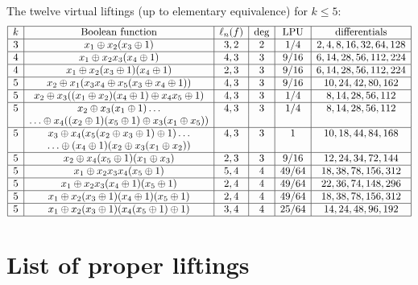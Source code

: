 \documentclass[11pt,english,a4paper]{amsart}
\theoremstyle{plain}
\theoremstyle{definition}
\theoremstyle{remark}
\begin{document}
	The twelve virtual liftings (up to elementary equivalence) for $k \leq 5$:
	\[
	\begin{array}{|c|c|c|c|c|c|} \hline
		k & \text{Boolean function} & \ell_n(f) & \deg & \operatorname{LPU} & \text{differentials} \\ \hline
		3 & x_1 \oplus x_2(x_3\oplus 1) & 3, 2 & 2 & 1/4 & 2, 4, 8, 16, 32, 64, 128 \\
		\hline
		4 & x_1 \oplus x_2 x_3 (x_4\oplus1) & 4, 3 & 3 & 9/16 & 6, 14, 28, 56, 112, 224 \\
		\hline
		4 & x_1 \oplus x_2 (x_3\oplus1) (x_4\oplus1) & 2, 3 & 3 & 9/16 & 6, 14, 28, 56, 112, 224 \\
		\hline
		5 & x_2 \oplus x_1 (x_3 x_4 \oplus x_5 (x_3 \oplus x_4 \oplus 1)) & 4, 3 & 3 & 9/16 & 10, 24, 42, 80, 162 \\
		\hline
		5 & x_2 \oplus x_3 ((x_1 \oplus x_2) (x_4 \oplus 1) \oplus x_4 x_5 \oplus 1) & 4, 3 & 3 & 1/4 & 8, 14, 28, 56, 112 \\
		\hline
		5 & x_2 \oplus x_3 (x_1 \oplus 1) \dotsc& 4, 3 & 3 & 1/4 & 8, 14, 28, 56, 112 \\
		& \dotsc \oplus x_4 ((x_2 \oplus 1) (x_5 \oplus 1) \oplus x_3 (x_1 \oplus x_5)) & & & & \\
		\hline
		5 & x_3 \oplus x_4 (x_5 (x_2 \oplus x_3 \oplus 1) \oplus 1) \dotsc & 4, 3 & 3 & 1 & 10, 18, 44, 84, 168 \\
		& \dotsc \oplus (x_4 \oplus 1) (x_2 \oplus x_3 (x_1 \oplus x_2)) & & & & \\
		\hline
		5 & x_2 \oplus x_4 (x_5 \oplus 1) (x_1 \oplus x_3) & 2, 3 & 3 & 9/16 & 12, 24, 34, 72, 144 \\
		\hline
		5 & x_1 \oplus x_2 x_3 x_4 (x_5 \oplus 1) & 5, 4 & 4 & 49/64 & 18, 38, 78, 156, 312 \\
		\hline
		5 & x_1 \oplus x_2 x_3 (x_4 \oplus 1) (x_5 \oplus 1) & 2, 4 & 4 & 49/64 & 22, 36, 74, 148, 296 \\
		\hline
		5 & x_1 \oplus x_2 (x_3 \oplus 1) (x_4 \oplus 1) (x_5 \oplus 1) & 2, 4 & 4 & 49/64 & 18, 38, 78, 156, 312 \\
		\hline
		5 & x_1 \oplus x_2 (x_3 \oplus 1) (x_4 (x_5 \oplus 1) \oplus 1) & 3, 4 & 4 & 25/64 & 14, 24, 48, 96, 192 \\
		\hline
	\end{array}
	\]


	\section{List of proper liftings}\label{appendix:proper}
	
\end{document}
